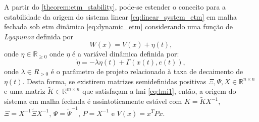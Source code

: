 \begin{corollary}
  \label{corollary:etm_stability} A partir do \autoref{theorem:etm_stability}, pode-se estender o conceito para a estabilidade da origem do sistema linear \eqref{eq:linear_system_etm} em malha fechada sob \acrshort{etm} dinâmico \eqref{eq:dynamic_etm} considerando uma função de \textit{Lyapunov} definida por \begin{equation}W(x) = V(x) + \eta(t) \label{eq:lyapunov_w},\end{equation} onde $\eta \in \mathbb{R}_{\geq 0}$ onde $\eta$ é a variável dinâmica definida por: \begin{equation}  \dot{\eta} = - \lambda \eta(t) + \Gamma(x(t), e(t)), \label{eq:eta_dynamic}\end{equation} onde $\lambda \in R_{> 0} $ é o parâmetro de projeto relacionado à taxa de decaimento de $\eta(t)$. Desta forma, se existirem matrizes semidefinidas positivas $\Xi, \Psi, X \in \mathbb{R}^{n \times n}$ e uma matriz $\tilde{K} \in \mathbb{R}^{m \times n}$ que satisfaçam a \acrshort{lmi} \eqref{eq:lmi1}, então, a origem do sistema em malha fechada é assintoticamente estável com $K = \tilde{K}X^{-1}$, $\Xi= X^{-1}\tilde{\Xi}X^{-1}$, $\Psi = \tilde{\Psi}^{-1}$, $P = X^{-1}$ e $V(x)=x^TPx$.
\end{corollary}

